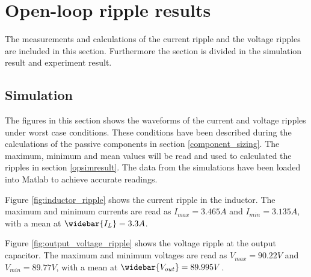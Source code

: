 
\chapter{Open-loop ripple results}

The measurements and calculations of the current ripple and the voltage ripples are included in this section. Furthermore the section is divided in the simulation result and experiment result.
 \label{app:OL_ripple}
 
\section{Simulation}
The figures in this section shows the waveforms of the current and voltage ripples under worst case conditions. These conditions have been described during the calculations of the passive components in section \ref{component_sizing}. The maximum, minimum and mean values will be read and used to calculated the ripples in section \ref{opsimresult}. The data from the simulations have been loaded into Matlab to achieve accurate readings.

Figure \ref{fig:inductor_ripple} shows the current ripple in the inductor. The maximum and minimum currents are read as $I_{max} = 3.465A$ and $I_{min} = 3.135A$, with a mean at $\widebar{I_L} = 3.3A$.

Figure \ref{fig:output_voltage_ripple} shows the voltage ripple at the output capacitor. The maximum and minimum voltages are read as $V_{max} = 90.22V$ and $V_{min} = 89.77V$, with a mean at $\widebar{V_{out}} = 89.995V$.


